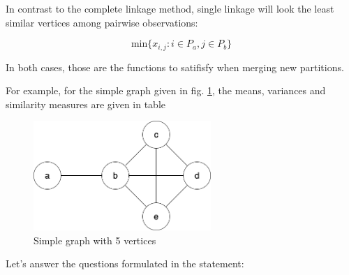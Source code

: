 \documentclass[12pt,a4paper]{article}
\begin{document}
In contrast to the complete linkage method, single linkage will look
the least similar vertices among pairwise observations:

$$ \mathrm{min}\{x_{i,j} : i \in P_a, j \in P_b\} $$

In both cases, those are the functions to satifisfy when merging new
partitions.


For example, for the simple graph given in
fig. \ref{fig:simple_graph}, the means, variances and similarity
measures are given in table

\begin{figure}[ht!]
  \centering
  \includegraphics[width=0.6\textwidth]{img/simple_graph.png}
  \caption{Simple graph with 5 vertices}
  \label{fig:simple_graph}
\end{figure}

Let's answer the questions formulated in the statement:
\end{document}
